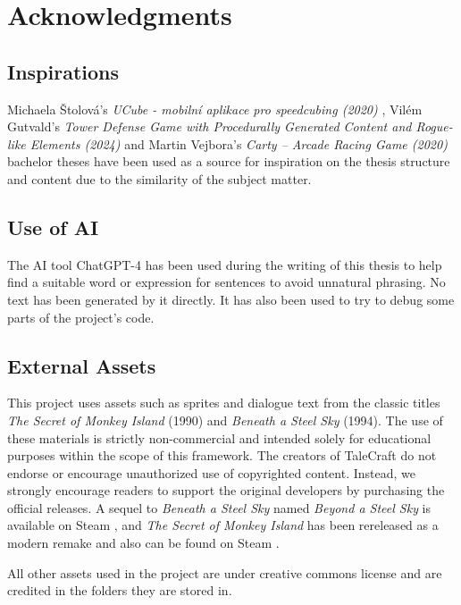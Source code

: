 \chapter{Acknowledgments}

\section{Inspirations}
Michaela Štolová's \textit{UCube - mobilní aplikace pro speedcubing (2020)} \cite{Stolova2020}, Vilém Gutvald's \textit{Tower Defense Game with Procedurally Generated Content and Rogue-like Elements (2024)} \cite{Gutvald2024} and Martin Vejbora's \textit{Carty – Arcade Racing Game (2020)} \cite{Vejbora2020} bachelor theses have been used as a source for inspiration on the thesis structure and content due to the similarity of the subject matter.

\section{Use of AI}
The AI tool ChatGPT-4 has been used during the writing of this thesis to help find a suitable word or expression for sentences to avoid unnatural phrasing. No text has been generated by it directly. It has also been used to try to debug some parts of the project's code.

\section{External Assets}
This project uses assets such as sprites and dialogue text from the classic titles \textit{The Secret of Monkey Island} (1990) and \textit{Beneath a Steel Sky} (1994). The use of these materials is strictly non-commercial and intended solely for educational purposes within the scope of this framework. The creators of TaleCraft do not endorse or encourage unauthorized use of copyrighted content. Instead, we strongly encourage readers to support the original developers by purchasing the official releases. A sequel to \textit{Beneath a Steel Sky} named \textit{Beyond a Steel Sky} is available on Steam \cite{Beyond-a-Steel-Sky}, and \textit{The Secret of Monkey Island} has been rereleased as a modern remake and also can be found on Steam \cite{TSoMI-steam}. 

All other assets used in the project are under creative commons license and are credited in the folders they are stored in.  
